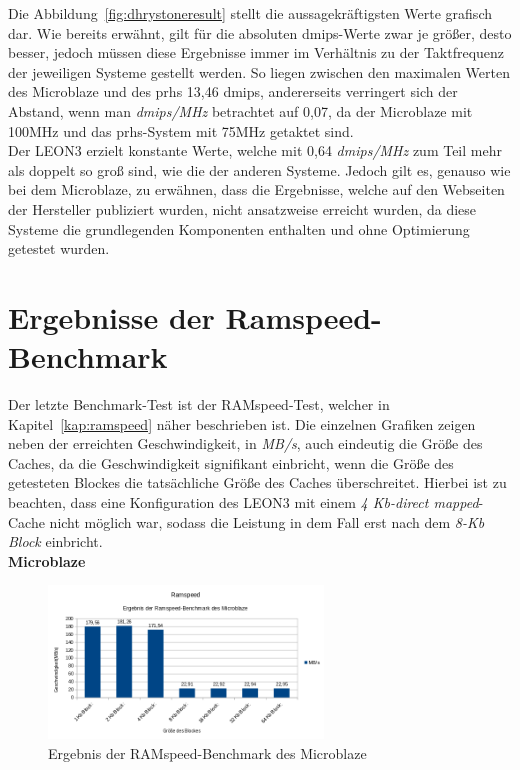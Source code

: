 Die Abbildung~\ref{fig:dhrystoneresult} stellt die aussagekräftigsten Werte grafisch dar. Wie bereits erwähnt,
 gilt für die absoluten \ac{dmips}-Werte zwar je größer, desto besser, jedoch müssen diese
Ergebnisse immer im Verhältnis zu der Taktfrequenz der jeweiligen Systeme gestellt werden. So liegen zwischen
den maximalen Werten des Microblaze und des \ac{prhs} 13,46 \ac{dmips}, andererseits
verringert sich der Abstand, wenn man \emph{\ac{dmips}/MHz} betrachtet auf 0,07, da der Microblaze mit 100MHz
und das \ac{prhs}-System mit 75MHz getaktet sind.\\
Der LEON3 erzielt konstante Werte, welche mit 0,64 \emph{\ac{dmips}/MHz} zum Teil mehr als doppelt so groß sind,
wie die der anderen Systeme. Jedoch gilt es, genauso wie bei dem Microblaze,
zu erwähnen, dass die Ergebnisse, welche auf den Webseiten der Hersteller publiziert wurden, nicht ansatzweise
erreicht wurden, da diese Systeme die grundlegenden Komponenten enthalten
und ohne Optimierung getestet wurden.\\

\section{Ergebnisse der Ramspeed-Benchmark}\label{kap:ramspeedtest}
Der letzte Benchmark-Test ist der RAMspeed-Test, welcher in Kapitel~\ref{kap:ramspeed} näher beschrieben ist. Die einzelnen Grafiken zeigen neben der
erreichten Geschwindigkeit, in \emph{MB/s}, auch eindeutig die Größe des Caches, da die Geschwindigkeit signifikant einbricht, wenn die Größe des getesteten Blockes die tatsächliche Größe
des Caches überschreitet.
\newpage
 Hierbei ist zu beachten, dass eine Konfiguration des LEON3 mit einem \emph{4 Kb-direct mapped}-Cache nicht möglich war, sodass die Leistung in dem Fall erst nach dem
\emph{8-Kb Block} einbricht.\\

\textbf{Microblaze}

\begin{figure}[H]
\centering
\includegraphics[width=0.65\textwidth]{Hauptteil/ramspeedmicroblaze.png}
\caption{Ergebnis der RAMspeed-Benchmark des Microblaze}
\label{fig:ramspeedmicroblaze}
\end{figure}

